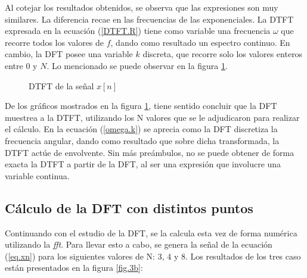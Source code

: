 \documentclass[11pt,a4paper]{article}
\begin{document}
    Al cotejar los resultados obtenidos, se observa que las expresiones son muy similares. La diferencia recae en las frecuencias de las exponenciales. La DTFT expresada en la ecuación (\ref{DTFT.R}) tiene como variable una frecuencia $\omega$ que recorre todos los valores de $f$, dando como resultado un espectro continuo. En cambio, la DFT posee una variable $k$ discreta, que recorre solo los valores enteros entre 0 y $N$. Lo mencionado se puede observar en la figura \ref{fig.3a}.
    
    
    \begin{figure}[htb]
    \centering
	\caption{DTFT de la señal $x[n]$}
	\label{fig.3a}
    \end{figure}
    
    De los gráficos mostrados en la figura \ref{fig.3a}, tiene sentido concluir que la DFT muestrea a la DTFT, utilizando los N valores que se le adjudicaron para realizar el cálculo. En la ecuación (\ref{omega.k}) se aprecia como la DFT discretiza la frecuencia angular, dando como resultado que sobre dicha transformada, la DTFT actúe de envolvente. Sin más preámbulos, no se puede obtener de forma exacta la DTFT a partir de la DFT, al ser una expresión que involucre una variable continua.
    

    \subsection{Cálculo de la DFT con distintos puntos}    
    Continuando con el estudio de la DFT, se la calcula esta vez de forma numérica utilizando la \textit{fft}. Para llevar esto a cabo, se genera la señal de la ecuación (\ref{eq.xn}) para los siguientes valores de N: 3, 4 y 8. Los resultados de los tres caso están presentados en la figura \ref{fig.3b}:
\end{document}
